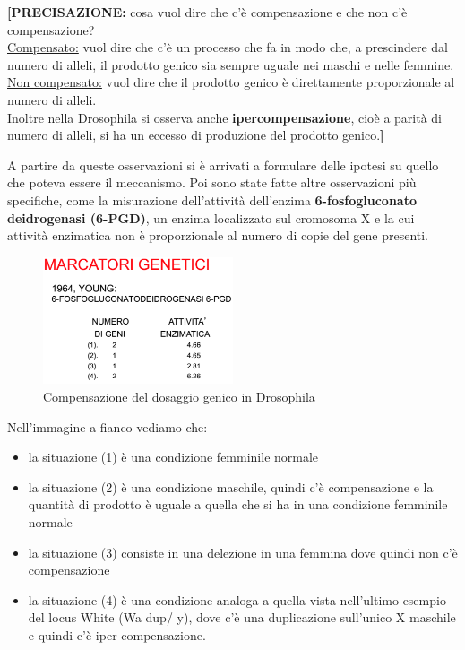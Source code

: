 \documentclass[11pt]{book}
\begin{document}
    
\textbf{[PRECISAZIONE:} cosa vuol dire che c’è compensazione e che non c’è compensazione?\\
\underline{Compensato:} vuol dire che c’è un processo che fa in modo che, a prescindere dal numero di alleli, il prodotto genico sia sempre uguale nei maschi e nelle femmine.\\
\underline{Non compensato:} vuol dire che il prodotto genico è direttamente proporzionale al numero di alleli.\\
Inoltre nella Drosophila si osserva anche \textbf{ipercompensazione}, cioè a parità di numero di alleli, si ha un eccesso di produzione del prodotto genico.\textbf{]}

A partire da queste osservazioni si è arrivati a formulare delle ipotesi su quello che poteva essere il meccanismo.
Poi sono state fatte altre osservazioni più specifiche, come la misurazione dell’attività dell’enzima \textbf{6-fosfogluconato deidrogenasi (6-PGD)}, un enzima localizzato sul cromosoma X e la cui attività enzimatica non è proporzionale al numero di copie del gene presenti.

\clearpage

\begin{figure}
    \includegraphics[width=0.5\textwidth]{img/marcatori_genetici_II.png}
  \caption{Compensazione del dosaggio genico in Drosophila}
\end{figure}

Nell'immagine a fianco vediamo che:
\begin{itemize}
\item la situazione (1) è una condizione femminile normale
\item la situazione (2) è una condizione maschile, quindi c’è compensazione e la quantità di prodotto è uguale a quella che si ha in una condizione femminile normale
\item la situazione (3) consiste in una delezione in una femmina dove quindi non c’è compensazione
\item la situazione (4) è una condizione analoga a quella vista nell’ultimo esempio del locus White (Wa dup/ y), dove c’è una duplicazione sull’unico X maschile e quindi c’è iper-compensazione.
\end{itemize}
\end{document}
